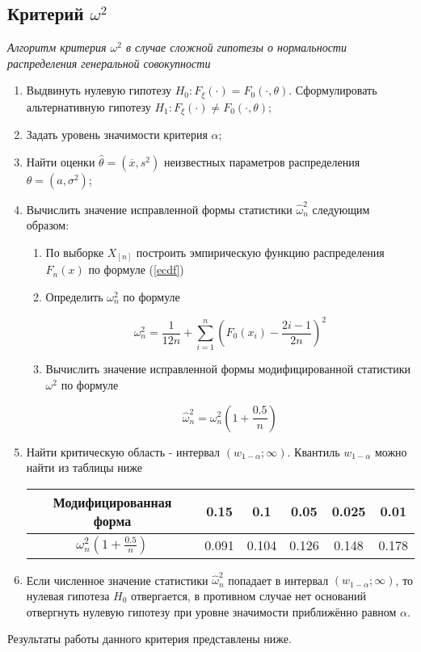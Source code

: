 \subsection{Критерий $\omega^2$}

\textit{Алгоритм критерия $\omega^2$ в случае сложной гипотезы о нормальности распределения генеральной совокупности}

\begin{enumerate}
	\item Выдвинуть нулевую гипотезу $H_0: F_{\xi}(\cdot) = F_0(\cdot, \theta)$. Сформулировать альтернативную гипотезу $H_1: F_{\xi}(\cdot) \ne F_0(\cdot, \theta)$;
	\item Задать уровень значимости критерия $\alpha$;
	\item Найти оценки $\hat{\theta} = (\overline{x}, s^2)$ неизвестных параметров распределения $\theta = (a, \sigma^2)$;
	\item Вычислить значение исправленной формы статистики $\hat{\omega}^2_n$ следующим образом:
	\begin{enumerate}
		\item По выборке $X_{[n]}$ построить эмпирическую функцию распределения $F_n(x)$ по формуле (\ref{ecdf})
		\item Определить $\omega^2_n$ по формуле 
		
		\begin{equation}
			\omega^2_n = \frac{1}{12n} + \sum\limits_{i=1}^n \left(F_0(x_i) - \frac{2i - 1}{2n} \right)^2
		\end{equation}
		
		\item Вычислить значение исправленной формы модифицированной статистики $\omega^2$ по формуле
		
		\begin{equation}
			\hat{\omega}^2_n = \omega^2_n \left(1 + \frac{0.5}{n} \right)
		\end{equation}
		
	\end{enumerate}
	
	\item Найти критическую область - интервал $(w_{1-\alpha}; \infty)$. Квантиль $w_{1 - \alpha}$ можно найти из таблицы ниже
	
	\begin{center}
		\begin{tabular}{|c|c|c|c|c|c|}
			\hline
			Модифицированная форма & 0.15 & 0.1 & 0.05 & 0.025 & 0.01 \\
			\hline
			$\omega^2_n \left(1 + \frac{0.5}{n} \right)$ & 0.091 & 0.104 & 0.126 & 0.148 & 0.178 \\
			\hline
		\end{tabular}
	\end{center}
	
	\item Если численное значение статистики $\hat{\omega}^2_n$ попадает в интервал $(w_{1 - \alpha}; \infty)$, то нулевая гипотеза $H_0$ отвергается, в противном случае нет оснований отвергнуть нулевую гипотезу при уровне значимости приближённо равном $\alpha$.
	
\end{enumerate}

Результаты работы данного критерия представлены ниже.

